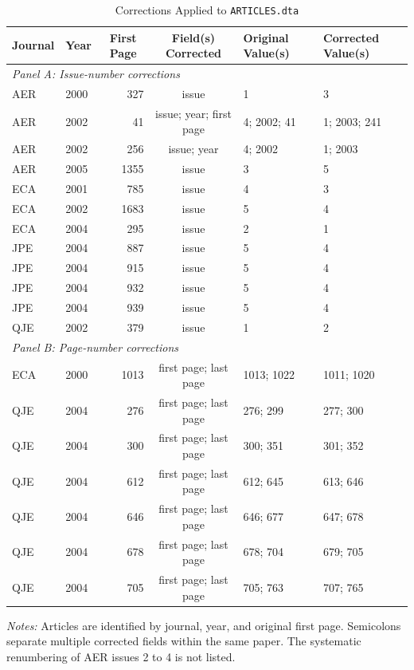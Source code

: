 \begin{table}[!htbp]
\renewcommand{\arraystretch}{1.1}
\centering
{}
\caption{Corrections Applied to \texttt{ARTICLES.dta}}
\label{tab:corrections}
\small
\begin{tabular}{llrcll}
\toprule
Journal & Year & \multicolumn{1}{c}{First Page} & Field(s) Corrected & Original Value(s) & Corrected Value(s) \\
\midrule
\multicolumn{6}{l}{\textit{Panel A: Issue-number corrections}} \\[2pt]
AER & 2000 & 327 & issue & 1 & 3 \\
AER & 2002 & 41 & issue; year; first page & 4; 2002; 41 & 1; 2003; 241 \\
AER & 2002 & 256 & issue; year & 4; 2002 & 1; 2003 \\
AER & 2005 & 1355 & issue & 3 & 5 \\
ECA & 2001 & 785 & issue & 4 & 3 \\
ECA & 2002 & 1683 & issue & 5 & 4 \\
ECA & 2004 & 295 & issue & 2 & 1 \\
JPE & 2004 & 887 & issue & 5 & 4 \\
JPE & 2004 & 915 & issue & 5 & 4 \\
JPE & 2004 & 932 & issue & 5 & 4 \\
JPE & 2004 & 939 & issue & 5 & 4 \\
QJE & 2002 & 379 & issue & 1 & 2 \\[4pt]
\multicolumn{6}{l}{\textit{Panel B: Page-number corrections}} \\[2pt]
ECA & 2000 & 1013 & first page; last page & 1013; 1022 & 1011; 1020 \\
QJE & 2004 & 276 & first page; last page & 276; 299 & 277; 300 \\
QJE & 2004 & 300 & first page; last page & 300; 351 & 301; 352 \\
QJE & 2004 & 612 & first page; last page & 612; 645 & 613; 646 \\
QJE & 2004 & 646 & first page; last page & 646; 677 & 647; 678 \\
QJE & 2004 & 678 & first page; last page & 678; 704 & 679; 705 \\
QJE & 2004 & 705 & first page; last page & 705; 763 & 707; 765 \\
\bottomrule
\end{tabular}
\begin{minipage}{\linewidth}
\vspace{4pt}
\footnotesize\textit{Notes:} Articles are identified by journal, year, and original first page. Semicolons separate multiple corrected fields within the same paper. The systematic renumbering of AER issues 2 to 4 is not listed.
\end{minipage}
\end{table}